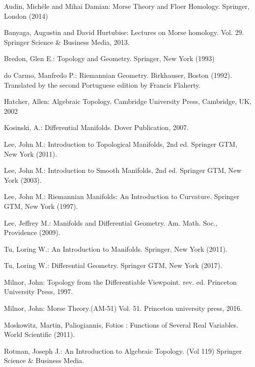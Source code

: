 \documentclass[a4paper]{article}
\theoremstyle{remark}
\begin{document}
\begin{thebibliography}{9}
Audin, Mich\'ele and Mihai Damian: Morse Theory and Floer Homology. Springer, London (2014)

Banyaga, Augustin and David Hurtubise: Lectures on Morse homology. Vol. 29. Springer Science \& Business Media, 2013.

Bredon, Glen E.: Topology and Geometry. Springer, New York (1993)

do Carmo, Manfredo P.: Riemannian Geometry. Birkhauser, Boston (1992). Translated by the second Portuguese edition by Francis Flaherty.

Hatcher, Allen: Algebraic Topology. Cambridge University Press, Cambridge, UK, 2002

Kosinski, A.: Differential Manifolds. Dover Publication, 2007.

 Lee, John M.: Introduction to Topological Manifolds, 2nd ed. Springer GTM, New York (2011).

Lee, John M.: Introduction to Smooth Manifolds, 2nd ed. Springer GTM, New York (2003).

Lee, John M.: Riemannian Manifolds: An Introduction to Curvature. Springer GTM, New York (1997).

 Lee, Jeffrey M.: Manifolds and Differential Geometry. Am. Math. Soc., Providence (2009).

 Tu, Loring W.: An Introduction to Manifolds. Springer, New York (2011).

 Tu, Loring W.: Differential Geometry. Springer GTM, New York (2017).

Milnor, John: Topology from the Differentiable Viewpoint. rev. ed. Princeton University
Press, 1997.

Milnor, John: Morse Theory.(AM-51) Vol. 51. Princeton university press, 2016.

 Moskowitz, Martin, Paliogiannis, Fotios : Functions of Several Real Variables. World Scientific (2011).

 Rotman, Joseph J.: An Introduction to Algebraic Topology. (Vol 119) Springer Science \& Business Media.


\end{thebibliography}
\end{document}

